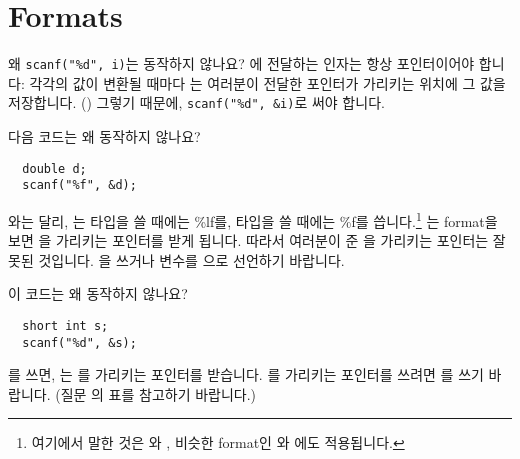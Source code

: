 \section{ Formats}	\label{sec:scanf}

\begin{faq}
	왜 \verb+scanf("%d", i)+는 동작하지 않나요?
\A
	에 전달하는 인자는 항상 포인터이어야 합니다:
	각각의 값이 변환될 때마다 는 여러분이 전달한 포인터가
	가리키는 위치에 그 값을 저장합니다. ()
	그렇기 때문에, \verb+scanf("%d", &i)+로 써야 합니다.
\end{faq}

\begin{faq}
	다음 코드는 왜 동작하지 않나요?
\begin{verbatim}
  double d;
  scanf("%f", &d);
\end{verbatim}
\A
	와는 달리, 는  타입을 쓸 때에는
	\%lf를,  타입을 쓸 때에는 \%f를 씁니다.\footnote{여기에서
	말한 것은 와 , 비슷한 format인 와 
	에도 적용됩니다.}
	는  format을 보면 을 가리키는 포인터를
	받게 됩니다.  따라서 여러분이 준 을 가리키는 포인터는
	잘못된 것입니다.  을 쓰거나 변수를 으로 선언하기
	바랍니다.
\end{faq}

\begin{faq}
	이 코드는 왜 동작하지 않나요?
\begin{verbatim}
  short int s;
  scanf("%d", &s);
\end{verbatim}

\A
	를 쓰면, 는 를 가리키는 포인터를
	받습니다. 를 가리키는 포인터를 쓰려면
	를 쓰기 바랍니다. (질문 의 표를 참고하기 바랍니다.)
\end{faq}

